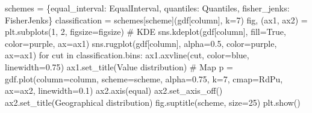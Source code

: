 \documentclass[
  letterpaper,
  DIV=11,
  numbers=noendperiod]{scrreprt}
\newenvironment{Shaded}{\begin{snugshade}}{\end{snugshade}}
\newcommand{\CommentTok}[1]{\textcolor[rgb]{0.37,0.37,0.37}{#1}}
\newcommand{\ControlFlowTok}[1]{\textcolor[rgb]{0.00,0.23,0.31}{#1}}
\newcommand{\DecValTok}[1]{\textcolor[rgb]{0.68,0.00,0.00}{#1}}
\newcommand{\FloatTok}[1]{\textcolor[rgb]{0.68,0.00,0.00}{#1}}
\newcommand{\KeywordTok}[1]{\textcolor[rgb]{0.00,0.23,0.31}{#1}}
\newcommand{\NormalTok}[1]{\textcolor[rgb]{0.00,0.23,0.31}{#1}}
\newcommand{\OperatorTok}[1]{\textcolor[rgb]{0.37,0.37,0.37}{#1}}
\newcommand{\StringTok}[1]{\textcolor[rgb]{0.13,0.47,0.30}{#1}}
\newcommand{\VariableTok}[1]{\textcolor[rgb]{0.07,0.07,0.07}{#1}}
\begin{document}
\begin{Shaded}
\begin{Highlighting}[]
\CommentTok{    \textquotesingle{}\textquotesingle{}\textquotesingle{}}
\NormalTok{    schemes }\OperatorTok{=}\NormalTok{ \{}\StringTok{\textquotesingle{}equal\_interval\textquotesingle{}}\NormalTok{: EqualInterval, }\StringTok{\textquotesingle{}quantiles\textquotesingle{}}\NormalTok{: Quantiles, }\StringTok{\textquotesingle{}fisher\_jenks\textquotesingle{}}\NormalTok{: FisherJenks\} }
\NormalTok{    classification }\OperatorTok{=}\NormalTok{ schemes[scheme](gdf[column], k}\OperatorTok{=}\DecValTok{7}\NormalTok{)}
\NormalTok{    fig, (ax1, ax2) }\OperatorTok{=}\NormalTok{ plt.subplots(}\DecValTok{1}\NormalTok{, }\DecValTok{2}\NormalTok{, figsize}\OperatorTok{=}\NormalTok{figsize)}
    \CommentTok{\# KDE}
\NormalTok{    sns.kdeplot(gdf[column], fill}\OperatorTok{=}\VariableTok{True}\NormalTok{, color}\OperatorTok{=}\StringTok{\textquotesingle{}purple\textquotesingle{}}\NormalTok{, ax}\OperatorTok{=}\NormalTok{ax1)}
\NormalTok{    sns.rugplot(gdf[column], alpha}\OperatorTok{=}\FloatTok{0.5}\NormalTok{, color}\OperatorTok{=}\StringTok{\textquotesingle{}purple\textquotesingle{}}\NormalTok{, ax}\OperatorTok{=}\NormalTok{ax1)}
    \ControlFlowTok{for}\NormalTok{ cut }\KeywordTok{in}\NormalTok{ classification.bins:}
\NormalTok{        ax1.axvline(cut, color}\OperatorTok{=}\StringTok{\textquotesingle{}blue\textquotesingle{}}\NormalTok{, linewidth}\OperatorTok{=}\FloatTok{0.75}\NormalTok{)}
\NormalTok{    ax1.set\_title(}\StringTok{\textquotesingle{}Value distribution\textquotesingle{}}\NormalTok{)}
    \CommentTok{\# Map}
\NormalTok{    p }\OperatorTok{=}\NormalTok{ gdf.plot(column}\OperatorTok{=}\NormalTok{column, scheme}\OperatorTok{=}\NormalTok{scheme, alpha}\OperatorTok{=}\FloatTok{0.75}\NormalTok{, k}\OperatorTok{=}\DecValTok{7}\NormalTok{, cmap}\OperatorTok{=}\StringTok{\textquotesingle{}RdPu\textquotesingle{}}\NormalTok{, ax}\OperatorTok{=}\NormalTok{ax2, linewidth}\OperatorTok{=}\FloatTok{0.1}\NormalTok{)}
\NormalTok{    ax2.axis(}\StringTok{\textquotesingle{}equal\textquotesingle{}}\NormalTok{)}
\NormalTok{    ax2.set\_axis\_off()}
\NormalTok{    ax2.set\_title(}\StringTok{\textquotesingle{}Geographical distribution\textquotesingle{}}\NormalTok{)}
\NormalTok{    fig.suptitle(scheme, size}\OperatorTok{=}\DecValTok{25}\NormalTok{)}
\NormalTok{    plt.show()}
\end{Highlighting}
\end{Shaded}
\end{document}
